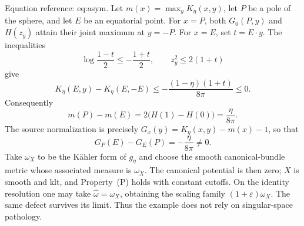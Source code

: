 \documentclass[10pt]{article}
\begin{document}
Equation reference: eq:asym. Let \(m(x)=\max_y K_\eta(x,y)\), let \(P\) be a pole of the sphere, and let \(E\) be an equatorial point. For \(x=P\), both \(G_0(P,y)\) and \(H(z_y)\) attain their joint maximum at \(y=-P\). For \(x=E\), set \(t=E\cdot y\). The inequalities \[\log\frac{1-t}{2}\leq-\frac{1+t}{2},
 \qquad z_y^2\leq2(1+t)\] give \[K_\eta(E,y)-K_\eta(E,-E)
 \leq-\frac{(1-\eta)(1+t)}{8\pi}\leq0.\] Consequently \[m(P)-m(E)=2\bigl(H(1)-H(0)\bigr)=\frac{\eta}{8\pi}.\] The source normalization is precisely \(G_x(y)=K_\eta(x,y)-m(x)-1\), so that \[
 G_P(E)-G_E(P)=-\frac{\eta}{8\pi}\ne0.\] Take \(\omega_X\) to be the Kähler form of \(g_\eta\) and choose the smooth canonical-bundle metric whose associated measure is \(\omega_X\). The canonical potential is then zero; \(X\) is smooth and klt, and Property (P) holds with constant cutoffs. On the identity resolution one may take \(\widehat\omega=\omega_X\), obtaining the scaling family \((1+\varepsilon)\omega_X\). The same defect survives its limit. Thus the example does not rely on singular-space pathology.\par
\end{document}
